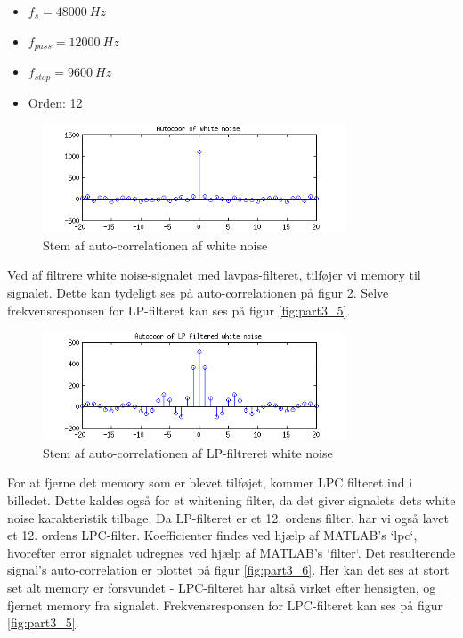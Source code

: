 \begin{itemize}
	\item $f_s = 48000\ Hz$
	\item $f_{pass} = 12000\ Hz$
	\item $f_{stop} = 9600\ Hz$
	\item Orden: 12
\end{itemize} 

\begin{figure}[!ht]
	\centering
	\includegraphics[width=0.8\textwidth]{resources/part3_white_noise_xcorr}
 	\caption{Stem af auto-correlationen af white noise}
 	\label{fig:part3_3}
\end{figure}

Ved af filtrere white noise-signalet med lavpas-filteret, tilføjer vi memory til signalet. Dette kan tydeligt ses på auto-correlationen på figur \ref{fig:part3_4}. Selve frekvensresponsen for LP-filteret kan ses på figur \ref{fig:part3_5}.

\begin{figure}[!ht]
	\centering
	\includegraphics[width=0.8\textwidth]{resources/part3_lp_filtered_white_noise_xcorr}
 	\caption{Stem af auto-correlationen af LP-filtreret white noise}
 	\label{fig:part3_4}
\end{figure}

For at fjerne det memory som er blevet tilføjet, kommer LPC filteret ind i billedet. Dette kaldes også for et whitening filter, da det giver signalets dets white noise karakteristik tilbage. Da LP-filteret er et 12. ordens filter, har vi også lavet et 12. ordens LPC-filter. Koefficienter findes ved hjælp af MATLAB's `lpc`, hvorefter error signalet udregnes ved hjælp af MATLAB's `filter`. Det resulterende signal's auto-correlation er plottet på figur \ref{fig:part3_6}. Her kan det ses at stort set alt memory er forsvundet - LPC-filteret har altså virket efter hensigten, og fjernet memory fra signalet. Frekvensresponsen for LPC-filteret kan ses på figur \ref{fig:part3_5}.

